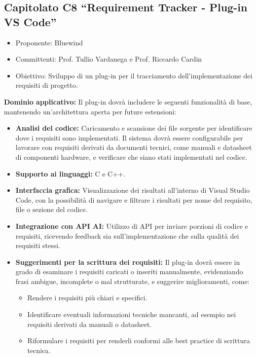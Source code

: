 \documentclass[10pt]{article}
\begin{document}
\subsection{Capitolato C8 “Requirement Tracker - Plug-in VS Code”}
\begin{itemize}
    \item Proponente: Bluewind
    \item Committenti: Prof. Tullio Vardanega e Prof. Riccardo Cardin
    \item Obiettivo: Sviluppo di un plug-in per il tracciamento dell'implementazione dei requisiti di progetto.
\end{itemize}
\textbf{Dominio applicativo:}  
Il plug-in dovrà includere le seguenti funzionalità di base, mantenendo un'architettura aperta per future estensioni:
\begin{itemize}
    \item \textbf{Analisi del codice:} Caricamento e scansione dei file sorgente per identificare dove i requisiti sono implementati. Il sistema dovrà essere configurabile per lavorare con requisiti derivati da documenti tecnici, come manuali e datasheet di componenti hardware, e verificare che siano stati implementati nel codice.
    \item \textbf{Supporto ai linguaggi:} C e C++.
    \item \textbf{Interfaccia grafica:} Visualizzazione dei risultati all'interno di Visual Studio Code, con la possibilità di navigare e filtrare i risultati per nome del requisito, file o sezione del codice.
    \item \textbf{Integrazione con API AI:} Utilizzo di API per inviare porzioni di codice e requisiti, ricevendo feedback sia sull'implementazione che sulla qualità dei requisiti stessi.
    \item \textbf{Suggerimenti per la scrittura dei requisiti:} Il plug-in dovrà essere in grado di esaminare i requisiti caricati o inseriti manualmente, evidenziando frasi ambigue, incomplete o mal strutturate, e suggerire miglioramenti, come:
    \begin{itemize}
        \item Rendere i requisiti più chiari e specifici.
        \item Identificare eventuali informazioni tecniche mancanti, ad esempio nei requisiti derivati da manuali o datasheet.
        \item Riformulare i requisiti per renderli conformi alle best practice di scrittura tecnica.
    \end{itemize}
\end{itemize}
\end{document}
